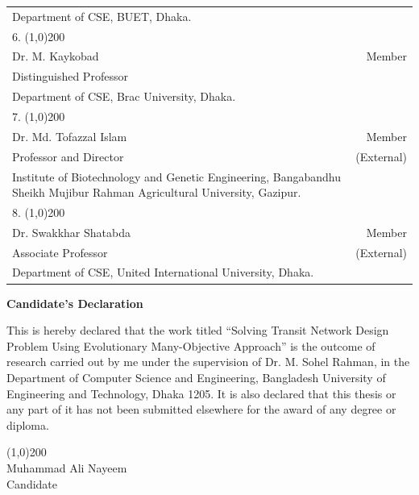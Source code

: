 \begin{singlespace}
{\begin{spacing}{0.5}
\begin{tabular}{p{12cm} r }
	Department of CSE, BUET, Dhaka.  & \\
 	\vspace{0.1cm}
 	6. \line(1,0){200} &  \\
 	Dr. M. Kaykobad  & Member\\ 
 	Distinguished Professor & \\
 	Department of CSE, Brac University, Dhaka.  & \\
 	\vspace{0.1cm}
 	7. \line(1,0){200} &  \\
 	Dr. Md. Tofazzal Islam & Member\\ 
 	Professor and Director  & (External)\\
 	Institute of Biotechnology and Genetic Engineering, Bangabandhu Sheikh Mujibur Rahman
Agricultural University, Gazipur. & \\
 	\vspace{0.3cm}
 	8. \line(1,0){200} &  \\
 	Dr. Swakkhar Shatabda & Member\\ 
 	Associate Professor  & (External)\\
 	Department of CSE, United International University, Dhaka. & \\
 \end{tabular}
 \end{spacing}
}
\end{singlespace}
 \newpage
 \begin{center}
 \LARGE \textbf{Candidate's Declaration}
 \end{center}
 \vspace{3cm}
 This is hereby declared that the work titled ``Solving Transit Network Design Problem Using Evolutionary Many-Objective Approach'' is the outcome of research carried out by me under the supervision of Dr. M. Sohel Rahman, in the Department of Computer Science and Engineering,
 Bangladesh University of Engineering and Technology, Dhaka 1205. 
 It is also declared that this thesis or any part of it has not been submitted elsewhere for the award of any degree or diploma. \\
 \vspace{4cm}
\begin{center}
 \line(1,0){200}\\
 \large
 Muhammad Ali Nayeem \\
 Candidate
\end{center}
 

 
 
 